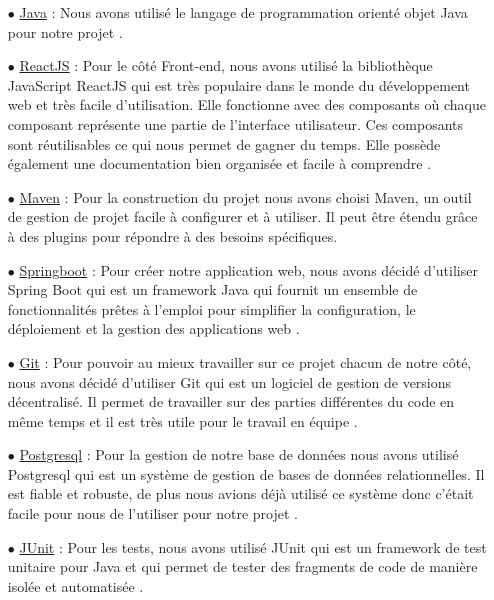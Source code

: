 \documentclass[a4paper]{report}
\begin{document}
\begin{itemize}
    \item[$\bullet$] \underline{Java} : Nous avons utilisé le langage de programmation orienté objet Java pour notre projet \cite{JavaSE17API}. \newline
    \item[$\bullet$] \underline{ReactJS} : Pour le côté Front-end, nous avons utilisé la bibliothèque JavaScript ReactJS qui est très populaire dans le monde du développement web et 
    très facile d'utilisation. Elle fonctionne avec des composants où chaque composant représente une partie de l'interface utilisateur. Ces composants sont réutilisables ce qui nous permet de gagner du temps. 
    Elle possède également une documentation bien organisée et facile à comprendre \cite{ReactJS}. \newline
    \item[$\bullet$] \underline{Maven} : Pour la construction du projet nous avons choisi Maven, un outil de gestion de projet facile à configurer et à utiliser. Il peut être étendu grâce à des plugins pour répondre à des besoins spécifiques. \cite{ApacheMaven}\newline
    \item[$\bullet$] \underline{Springboot} : Pour créer notre application web, nous avons décidé d'utiliser Spring Boot qui est un framework Java qui fournit un ensemble de fonctionnalités prêtes à l'emploi pour simplifier la configuration, 
    le déploiement et la gestion des applications web \cite{springboot}. \newline 
    \item[$\bullet$] \underline{Git} : Pour pouvoir au mieux travailler sur ce projet chacun de notre côté, nous avons décidé d'utiliser Git qui est un logiciel de gestion de versions décentralisé. Il permet de travailler
    sur des parties différentes du code en même temps et il est très utile pour le travail en équipe \cite{GitDocumentation}.\newline
    \item[$\bullet$] \underline{Postgresql} : Pour la gestion de notre base de données nous avons utilisé Postgresql qui est un système de gestion de bases de données relationnelles. Il est fiable et robuste, de plus 
    nous avions déjà utilisé ce système donc c'était facile pour nous de l'utiliser pour notre projet \cite{postgresql_doc}. \newline
    \item[$\bullet$] \underline{JUnit} : Pour les tests, nous avons utilisé JUnit qui est un framework de test unitaire pour Java et qui permet de tester des fragments de code de manière isolée et automatisée \cite{JUnit5}.\newline
\end{itemize}
\end{document}
